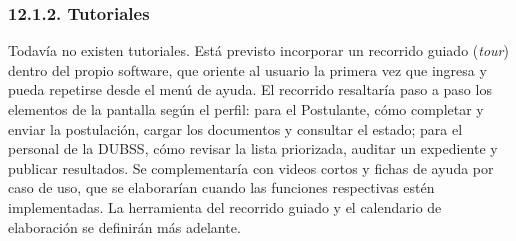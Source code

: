 \subsubsection{12.1.2. Tutoriales}

Todavía no existen tutoriales. Está previsto incorporar un recorrido guiado (\textit{tour}) dentro del propio software, que oriente al usuario la primera vez que ingresa y pueda repetirse desde el menú de ayuda. El recorrido resaltaría paso a paso los elementos de la pantalla según el perfil: para el Postulante, cómo completar y enviar la postulación, cargar los documentos y consultar el estado; para el personal de la DUBSS, cómo revisar la lista priorizada, auditar un expediente y publicar resultados. Se complementaría con videos cortos y fichas de ayuda por caso de uso, que se elaborarían cuando las funciones respectivas estén implementadas. La herramienta del recorrido guiado y el calendario de elaboración se definirán más adelante.
